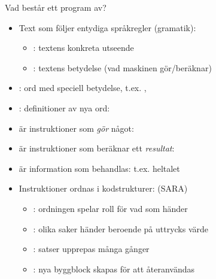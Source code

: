 \begin{Slide}{Vad består ett program av?}
\begin{itemize}
\item Text som följer entydiga språkregler (gramatik): 
\begin{itemize}
\item {}: textens konkreta utseende 
\item {}: textens betydelse (vad maskinen gör/beräknar)
\end{itemize}
\item {}: ord med speciell betydelse, t.ex. , 
\item {}: definitioner av nya ord: 
\item {} är instruktioner som \emph{gör} något:  
\item {} är instruktioner som beräknar ett \emph{resultat}: 
\item {} är information som behandlas: t.ex. heltalet 
\item Instruktioner ordnas i kodstrukturer: (SARA)
\begin{itemize}
\item {}: ordningen spelar roll för vad som händer
\item {}: olika saker händer beroende på uttrycks värde
\item {}: satser upprepas många gånger
\item {}: nya byggblock skapas för att återanvändas
\end{itemize}
\end{itemize}
\end{Slide}

